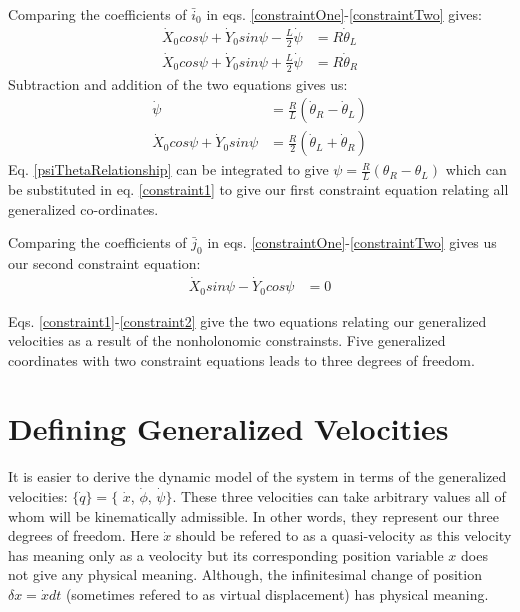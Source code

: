 \documentclass[a4paper,10pt]{article}
\begin{document}
Comparing the coefficients of $\bar{i}_0$ in eqs. \ref{constraintOne}-\ref{constraintTwo} gives:
\begin{align}
 \dot{X}_0 cos\psi + \dot{Y}_0 sin\psi - \frac{L}{2}\dot{\psi} &= R\dot\theta_L \label{thetaL} \\
 \dot{X}_0 cos\psi + \dot{Y}_0 sin\psi + \frac{L}{2}\dot{\psi} &= R\dot\theta_R \label{thetaR} 
\end{align}
Subtraction and addition of the two equations gives us:
\begin{align}
 \dot{\psi} &= \frac{R}{L}(\dot\theta_R - \dot\theta_L) \label{psiThetaRelationship} \\
 \dot{X}_0 cos\psi + \dot{Y}_0 sin\psi &= \frac{R}{2}(\dot\theta_L + \dot\theta_R) \label{constraint1} 
\end{align}
Eq. \ref{psiThetaRelationship} can be integrated to give $\psi = \frac{R}{L}(\theta_R - \theta_L)$ which can be substituted in
eq. \ref{constraint1} to give our first constraint equation relating all generalized co-ordinates.

Comparing the coefficients of $\bar{j}_0$ in eqs. \ref{constraintOne}-\ref{constraintTwo} gives us our second constraint equation:
\begin{align}
 \dot{X}_0 sin\psi - \dot{Y}_0 cos\psi &= 0 \label{constraint2}
\end{align}

Eqs. \ref{constraint1}-\ref{constraint2} give the two equations relating our generalized velocities as a 
result of the nonholonomic constrainsts. Five generalized coordinates with two constraint equations leads
to three degrees of freedom.

\section{Defining Generalized Velocities}
It is easier to derive the dynamic model of the system in terms of the generalized velocities:
$\{\dot{q}\} = \{$ $\dot{x}$, $\dot{\phi}$, $\dot{\psi} \}$. These three velocities can take
arbitrary values all of whom will be kinematically admissible. In other words, they represent
our three degrees of freedom. Here $\dot{x}$ should be refered
to as a quasi-velocity as this velocity has meaning only as a veolocity but its corresponding
position variable $x$ does not give any physical meaning. Although, the infinitesimal change of
position $\delta x = \dot{x} dt$ (sometimes refered to as virtual displacement) has physical
meaning.
\end{document}
